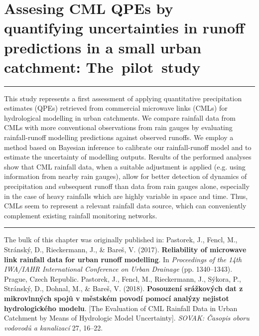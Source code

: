 \documentclass{ctuthesis}\usepackage[]{graphicx}\usepackage[]{color}
\begin{document}
        


\chapter{Assesing CML QPEs by quantifying uncertainties in runoff predictions in a small urban catchment: The~pilot~study} \label{chap4}



\rule{\textwidth}{0.4pt}
This study represents a first assessment of applying quantitative precipitation estimates (QPEs) retrieved from commercial microwave links (CMLs) for hydrological modelling in urban catchments. We compare rainfall data from CMLs with more conventional observations from rain gauges by evaluating rainfall-runoff modelling predictions against observed runoffs. We employ a method based on Bayesian inference to calibrate our rainfall-runoff model and to estimate the uncertainty of modelling outputs. Results of the performed analyses show that CML rainfall data, when a suitable adjustment is applied (e.g. using information from nearby rain gauges), allow for better detection of dynamics of precipitation and subsequent runoff than data from rain gauges alone, especially in the case of heavy rainfalls which are highly variable in space and time. Thus, CMLs seem to represent a relevant rainfall data source, which can conveniently complement existing rainfall monitoring networks.
\rule[0.2cm]{\textwidth}{0.4pt}

{\footnotesize The bulk of this chapter was originally published in: \newline
\-\hspace{0.5cm}
Pastorek, J., Fencl, M., Stránský, D., Rieckermann, J., \& Bareš, V. (2017). \textbf{Reliability
of microwave link rainfall data for urban runoff modelling}. In \emph{Proceedings of the
14th IWA/IAHR International Conference on Urban Drainage} (pp. 1340--1343). Prague, Czech Republic.
\newline \-\hspace{0.5cm}
Pastorek, J., Fencl, M., Rieckermann, J., Sýkora, P., Stránský, D., Dohnal, M., \& Bareš, V. (2018). \textbf{Posouzení srážkových dat z mikrovlnných spojů v městském povodí pomocí analýzy nejistot hydrologického modelu}. [The Evaluation of CML Rainfall Data in Urban Catchment by Means of Hydrologic Model Uncertainty]. \emph{SOVAK: Časopis oboru vodovodů a kanalizací} 27, 16--22.
}
\end{document}
